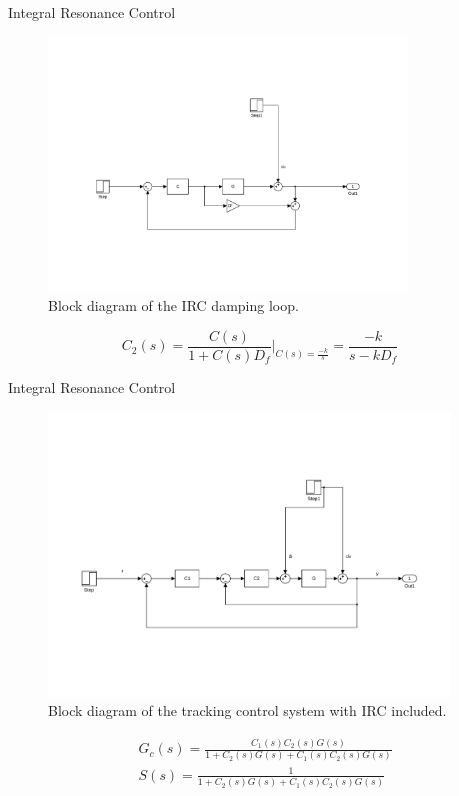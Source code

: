 \documentclass[10pt]{beamer}
\begin{document}
\begin{frame}{Integral Resonance Control}
  \begin{figure}[h]
    \centering %
    \includegraphics[width=0.85\textwidth, trim=5.5cm 4cm 5.1cm 9.5cm, clip=true]{../fig/matlab/irc}
    \caption{\label{fig:irc}Block diagram of the IRC damping loop.}
  \end{figure}
  \begin{equation}
    \label{eq:C2}
    C_2(s) = \frac{C(s)}{1+C(s)D_f}\Bigg|_{C(s) = \frac{-k}{s}} = \frac{-k}{s - kD_f}
  \end{equation}
\end{frame}

\begin{frame}{Integral Resonance Control}
  \begin{figure}[h]
    \centering %
    \includegraphics[width=0.95\textwidth, trim=4cm 5cm 3.6cm 9.5cm, clip=true]{../fig/matlab/irc_int}
    \caption{\label{fig:irc_int}Block diagram of the tracking control system with IRC included.}
  \end{figure}
  \begin{subequations}
    \label{eq:discrsys}
    \begin{alignat}{2}
      & G_c(s) = \frac{C_1(s)C_2(s)G(s)}{1 + C_2(s)G(s) + C_1(s)C_2(s)G(s)} \\
      & S(s) = \frac{1}{1 + C_2(s)G(s) + C_1(s)C_2(s)G(s)} \label{eq:discrsys1}
    \end{alignat}
  \end{subequations}
\end{frame}
\end{document}
